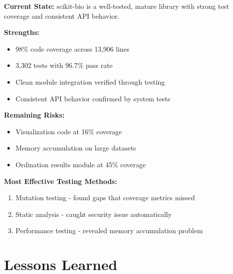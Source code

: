 \documentclass[11pt]{article}
\begin{document}
\textbf{Current State:} scikit-bio is a well-tested, mature library with strong test coverage and consistent API behavior.

\textbf{Strengths:}
\begin{itemize}[noitemsep]
    \item 98\% code coverage across 13,906 lines
    \item 3,302 tests with 96.7\% pass rate
    \item Clean module integration verified through testing
    \item Consistent API behavior confirmed by system tests
\end{itemize}

\textbf{Remaining Risks:}
\begin{itemize}[noitemsep]
    \item Visualization code at 16\% coverage
    \item Memory accumulation on large datasets
    \item Ordination results module at 45\% coverage
\end{itemize}

\textbf{Most Effective Testing Methods:}
\begin{enumerate}[noitemsep]
    \item Mutation testing - found gaps that coverage metrics missed
    \item Static analysis - caught security issue automatically
    \item Performance testing - revealed memory accumulation problem
\end{enumerate}

\section{Lessons Learned}
\end{document}
